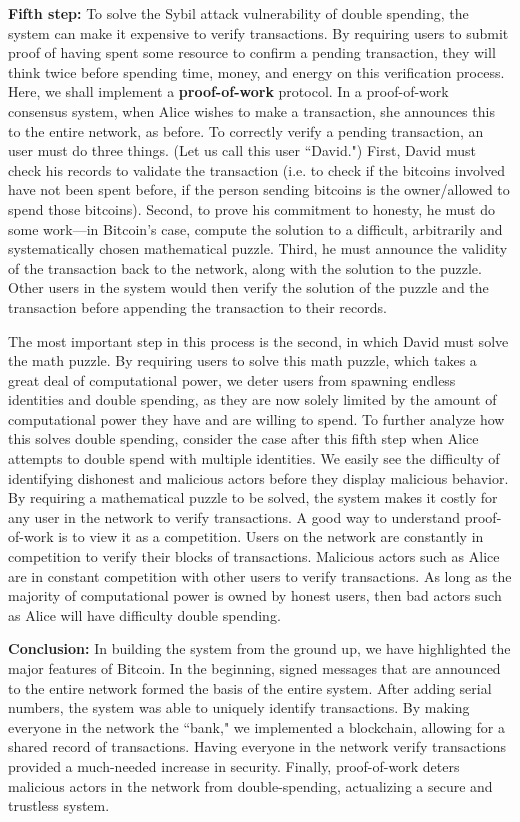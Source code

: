 \documentclass[11pt]{article}
\begin{document}
    \textbf{Fifth step:} To solve the Sybil attack vulnerability of double spending, the system can make it expensive to verify transactions. By requiring users to submit proof of having spent some resource to confirm a pending transaction, they will think twice before spending time, money, and energy on this verification process. Here, we shall implement a \textbf{proof-of-work} protocol. In a proof-of-work consensus system, when Alice wishes to make a transaction, she announces this to the entire network, as before. To correctly verify a pending transaction, an user must do three things. (Let us call this user ``David.") First, David must check his records to validate the transaction (i.e. to check if the bitcoins involved have not been spent before, if the person sending bitcoins is the owner/allowed to spend those bitcoins). Second, to prove his commitment to honesty, he must do some work---in Bitcoin's case, compute the solution to a difficult, arbitrarily and systematically chosen mathematical puzzle. Third, he must announce the validity of the transaction back to the network, along with the solution to the puzzle. Other users in the system would then verify the solution of the puzzle and the transaction before appending the transaction to their records.
    
    The most important step in this process is the second, in which David must solve the math puzzle. By requiring users to solve this math puzzle, which takes a great deal of computational power, we deter users from spawning endless identities and double spending, as they are now solely limited by the amount of computational power they have and are willing to spend. To further analyze how this solves double spending, consider the case after this fifth step when Alice attempts to double spend with multiple identities. We easily see the difficulty of identifying dishonest and malicious actors before they display malicious behavior. By requiring a mathematical puzzle to be solved, the system makes it costly for any user in the network to verify transactions. A good way to understand proof-of-work is to view it as a competition. Users on the network are constantly in competition to verify their blocks of transactions. Malicious actors such as Alice are in constant competition with other users to verify transactions. As long as the majority of computational power is owned by honest users, then bad actors such as Alice will have difficulty double spending.
    
    \textbf{Conclusion:} In building the system from the ground up, we have highlighted the major features of Bitcoin. In the beginning, signed messages that are announced to the entire network formed the basis of the entire system. After adding serial numbers, the system was able to uniquely identify transactions. By making everyone in the network the ``bank," we implemented a blockchain, allowing for a shared record of transactions. Having everyone in the network verify transactions provided a much-needed increase in security. Finally, proof-of-work deters malicious actors in the network from double-spending, actualizing a secure and trustless system. 
    
\end{document}
